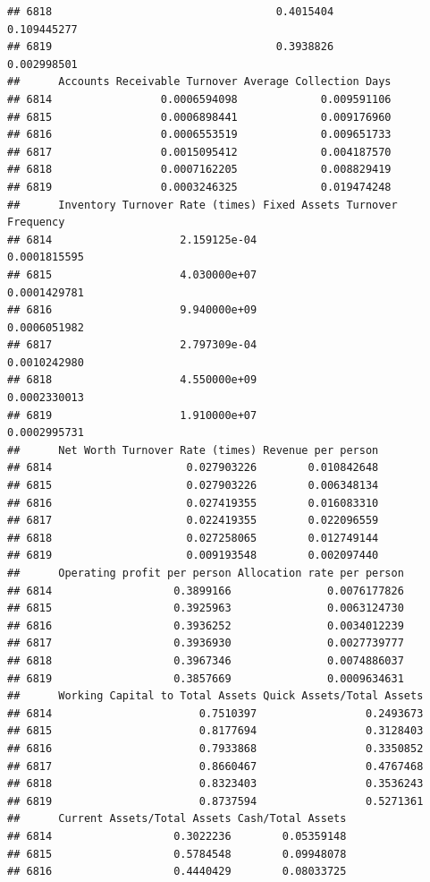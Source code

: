 \documentclass[
]{book}
\begin{document}
\begin{verbatim}
## 6818                                   0.4015404          0.109445277
## 6819                                   0.3938826          0.002998501
##      Accounts Receivable Turnover Average Collection Days
## 6814                 0.0006594098             0.009591106
## 6815                 0.0006898441             0.009176960
## 6816                 0.0006553519             0.009651733
## 6817                 0.0015095412             0.004187570
## 6818                 0.0007162205             0.008829419
## 6819                 0.0003246325             0.019474248
##      Inventory Turnover Rate (times) Fixed Assets Turnover Frequency
## 6814                    2.159125e-04                    0.0001815595
## 6815                    4.030000e+07                    0.0001429781
## 6816                    9.940000e+09                    0.0006051982
## 6817                    2.797309e-04                    0.0010242980
## 6818                    4.550000e+09                    0.0002330013
## 6819                    1.910000e+07                    0.0002995731
##      Net Worth Turnover Rate (times) Revenue per person
## 6814                     0.027903226        0.010842648
## 6815                     0.027903226        0.006348134
## 6816                     0.027419355        0.016083310
## 6817                     0.022419355        0.022096559
## 6818                     0.027258065        0.012749144
## 6819                     0.009193548        0.002097440
##      Operating profit per person Allocation rate per person
## 6814                   0.3899166               0.0076177826
## 6815                   0.3925963               0.0063124730
## 6816                   0.3936252               0.0034012239
## 6817                   0.3936930               0.0027739777
## 6818                   0.3967346               0.0074886037
## 6819                   0.3857669               0.0009634631
##      Working Capital to Total Assets Quick Assets/Total Assets
## 6814                       0.7510397                 0.2493673
## 6815                       0.8177694                 0.3128403
## 6816                       0.7933868                 0.3350852
## 6817                       0.8660467                 0.4767468
## 6818                       0.8323403                 0.3536243
## 6819                       0.8737594                 0.5271361
##      Current Assets/Total Assets Cash/Total Assets
## 6814                   0.3022236        0.05359148
## 6815                   0.5784548        0.09948078
## 6816                   0.4440429        0.08033725

\end{verbatim}
\end{document}
